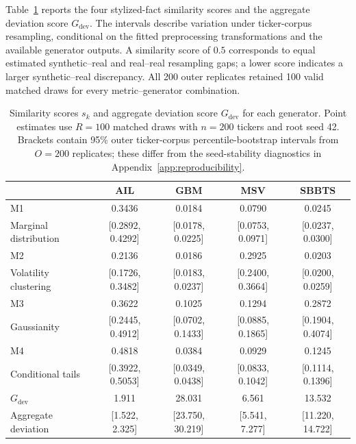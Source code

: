 {\color{red}
Table~\ref{tab:scores} reports the four stylized-fact similarity scores
and the aggregate deviation score $G_{\mathrm{dev}}$.
The intervals describe variation under ticker-corpus resampling,
conditional on the fitted preprocessing transformations and the available
generator outputs.
A similarity score of $0.5$ corresponds to equal estimated
synthetic--real and real--real resampling gaps; a lower score indicates
a larger synthetic--real discrepancy.
All 200 outer replicates retained 100 valid matched draws for every
metric--generator combination.
}

\begin{table}[htbp]
\centering
\color{red}
\caption{Similarity scores $s_k$ and aggregate deviation score $G_{\mathrm{dev}}$ for each generator. Point estimates use $R=100$ matched draws with $n=200$ tickers and root seed 42. Brackets contain 95\% outer ticker-corpus percentile-bootstrap intervals from $O=200$ replicates; these differ from the seed-stability diagnostics in Appendix~\ref{app:reproducibility}.}
\label{tab:scores}
\small
\setlength{\tabcolsep}{3pt}
\begin{tabular*}{\textwidth}{@{\extracolsep{\fill}}lcccc@{}}
\toprule
 & AIL & GBM & MSV & SBBTS \\
\midrule
M1 & 0.3436 & 0.0184 & 0.0790 & 0.0245 \\
\footnotesize Marginal distribution & \footnotesize[0.2892, 0.4292] & \footnotesize[0.0178, 0.0225] & \footnotesize[0.0753, 0.0971] & \footnotesize[0.0237, 0.0300] \\
\addlinespace
M2 & 0.2136 & 0.0186 & 0.2925 & 0.0203 \\
\footnotesize Volatility clustering & \footnotesize[0.1726, 0.3482] & \footnotesize[0.0183, 0.0237] & \footnotesize[0.2400, 0.3664] & \footnotesize[0.0200, 0.0259] \\
\addlinespace
M3 & 0.3622 & 0.1025 & 0.1294 & 0.2872 \\
\footnotesize Gaussianity & \footnotesize[0.2445, 0.4912] & \footnotesize[0.0702, 0.1433] & \footnotesize[0.0885, 0.1865] & \footnotesize[0.1904, 0.4074] \\
\addlinespace
M4 & 0.4818 & 0.0384 & 0.0929 & 0.1245 \\
\footnotesize Conditional tails & \footnotesize[0.3922, 0.5053] & \footnotesize[0.0349, 0.0438] & \footnotesize[0.0833, 0.1042] & \footnotesize[0.1114, 0.1396] \\
\addlinespace
\midrule
$G_{\mathrm{dev}}$ & 1.911 & 28.031 & 6.561 & 13.532 \\
\footnotesize Aggregate deviation & \footnotesize[1.522, 2.325] & \footnotesize[23.750, 30.219] & \footnotesize[5.541, 7.277] & \footnotesize[11.220, 14.722] \\
\bottomrule
\end{tabular*}
\end{table}

